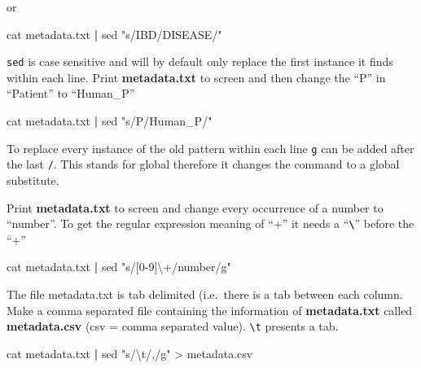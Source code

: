 \documentclass[
  letterpaper,
  DIV=11,
  numbers=noendperiod]{scrreprt}
\newenvironment{Shaded}{\begin{snugshade}}{\end{snugshade}}
\newcommand{\FunctionTok}[1]{\textcolor[rgb]{0.28,0.35,0.67}{#1}}
\newcommand{\KeywordTok}[1]{\textcolor[rgb]{0.00,0.23,0.31}{\textbf{#1}}}
\newcommand{\NormalTok}[1]{\textcolor[rgb]{0.00,0.23,0.31}{#1}}
\newcommand{\OperatorTok}[1]{\textcolor[rgb]{0.37,0.37,0.37}{#1}}
\newcommand{\StringTok}[1]{\textcolor[rgb]{0.13,0.47,0.30}{#1}}
\begin{document}
or

\begin{Shaded}
\begin{Highlighting}[]
\FunctionTok{cat}\NormalTok{ metadata.txt }\KeywordTok{|} \FunctionTok{sed} \StringTok{"s/IBD/DISEASE/"}
\end{Highlighting}
\end{Shaded}

\texttt{sed} is case sensitive and will by default only replace the
first instance it finds within each line. Print \textbf{metadata.txt} to
screen and then change the ``P'' in ``Patient'' to ``Human\_P''

\begin{Shaded}
\begin{Highlighting}[]
\FunctionTok{cat}\NormalTok{ metadata.txt }\KeywordTok{|} \FunctionTok{sed} \StringTok{"s/P/Human\_P/"}
\end{Highlighting}
\end{Shaded}

To replace every instance of the old pattern within each line \texttt{g}
can be added after the last \texttt{/}. This stands for global therefore
it changes the command to a global substitute.

Print \textbf{metadata.txt} to screen and change every occurrence of a
number to ``number''. To get the regular expression meaning of ``+'' it
needs a ``\textbf{\texttt{\textbackslash{}}}'' before the ``+''

\begin{Shaded}
\begin{Highlighting}[]
\FunctionTok{cat}\NormalTok{ metadata.txt }\KeywordTok{|} \FunctionTok{sed} \StringTok{"s/[0{-}9]\textbackslash{}+/number/g"}
\end{Highlighting}
\end{Shaded}

The file metadata.txt is tab delimited (i.e.~there is a tab between each
column. Make a comma separated file containing the information of
\textbf{metadata.txt} called \textbf{metadata.csv} (csv = comma
separated value). \texttt{\textbackslash{}t} presents a tab.

\begin{Shaded}
\begin{Highlighting}[]
\FunctionTok{cat}\NormalTok{ metadata.txt }\KeywordTok{|} \FunctionTok{sed} \StringTok{"s/\textbackslash{}t/,/g"} \OperatorTok{\textgreater{}}\NormalTok{ metadata.csv}
\end{Highlighting}
\end{Shaded}
\end{document}
